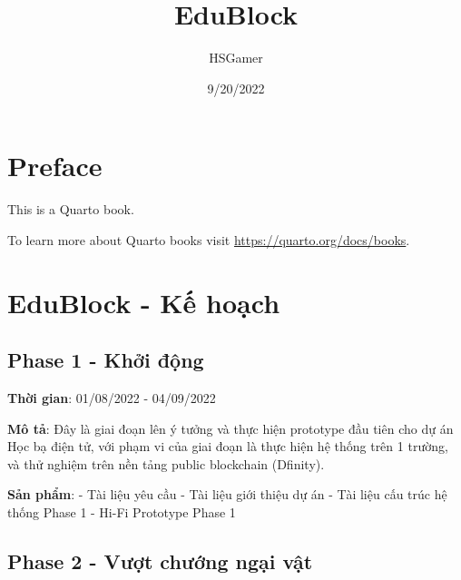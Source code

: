 \documentclass[
  letterpaper,
  DIV=11,
  numbers=noendperiod]{scrreprt}
\title{EduBlock}
\author{HSGamer}
\date{9/20/2022}
\renewcommand*\contentsname{Table of contents}
\newcommand\contentsname{Table of contents}
\begin{document}
\maketitle
\ifdefined\Shaded\renewenvironment{Shaded}{\begin{tcolorbox}[breakable, borderline west={3pt}{0pt}{shadecolor}, enhanced, sharp corners, frame hidden, interior hidden, boxrule=0pt]}{\end{tcolorbox}}\fi

\renewcommand*\contentsname{Table of contents}
{
\hypersetup{linkcolor=}
\setcounter{tocdepth}{2}
\tableofcontents
}

\hypertarget{preface}{%
\chapter*{Preface}\label{preface}}

This is a Quarto book.

To learn more about Quarto books visit
\url{https://quarto.org/docs/books}.


\hypertarget{edublock---kux1ebf-houx1ea1ch}{%
\chapter{EduBlock - Kế hoạch}\label{edublock---kux1ebf-houx1ea1ch}}

\hypertarget{phase-1---khux1edfi-ux111ux1ed9ng}{%
\section{Phase 1 - Khởi động}\label{phase-1---khux1edfi-ux111ux1ed9ng}}

\textbf{Thời gian}: 01/08/2022 - 04/09/2022

\textbf{Mô tả}: Đây là giai đoạn lên ý tưởng và thực hiện prototype đầu
tiên cho dự án Học bạ điện tử, với phạm vi của giai đoạn là thực hiện hệ
thống trên 1 trường, và thử nghiệm trên nền tảng public blockchain
(Dfinity).

\textbf{Sản phẩm}: - Tài liệu yêu cầu - Tài liệu giới thiệu dự án - Tài
liệu cấu trúc hệ thống Phase 1 - Hi-Fi Prototype Phase 1

\hypertarget{phase-2---vux1b0ux1ee3t-chux1b0ux1edbng-ngux1ea1i-vux1eadt}{%
\section{Phase 2 - Vượt chướng ngại
vật}\label{phase-2---vux1b0ux1ee3t-chux1b0ux1edbng-ngux1ea1i-vux1eadt}}
\end{document}
